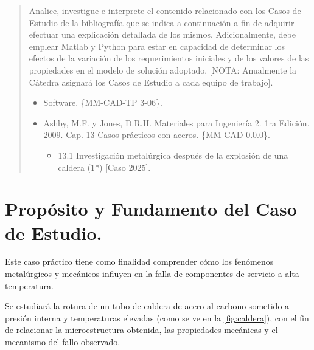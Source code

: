 \documentclass[12pt,a4paper]{article}
\begin{document}

\newpage
\tableofcontents

\begin{abstract}
    Analice, investigue e interprete el contenido relacionado con los Casos de Estudio de la bibliografía que se indica a continuación a fin de adquirir efectuar una explicación detallada de los mismos. Adicionalmente, debe emplear Matlab y Python para estar en capacidad de determinar los efectos de la variación de los requerimientos iniciales y de los valores de las propiedades en el modelo de solución adoptado. [NOTA: Anualmente la Cátedra asignará los Casos de Estudio a cada equipo de trabajo].
    \begin{itemize}
        \item Software. \{MM-CAD-TP 3-06\}.
        \item Ashby, M.F. y Jones, D.R.H. Materiales para Ingeniería 2. 1ra Edición. 2009. Cap. 13 Casos prácticos con aceros. \{MM-CAD-0.0.0\}.
        \begin{itemize}
            \item 13.1 Investigación metalúrgica después de la explosión de una caldera (1*) [Caso 2025].
        \end{itemize}
    \end{itemize}
\end{abstract}

\section{Propósito y Fundamento del Caso de Estudio.}

Este caso práctico tiene como finalidad comprender cómo los fenómenos metalúrgicos y mecánicos influyen en la falla de componentes de servicio a alta temperatura.

Se estudiará la rotura de un tubo de caldera de acero al carbono sometido a presión interna y temperaturas elevadas (como se ve en la \autoref{fig:caldera}), con el fin de relacionar la microestructura obtenida, las propiedades mecánicas y el mecanismo del fallo observado.
\end{document}
